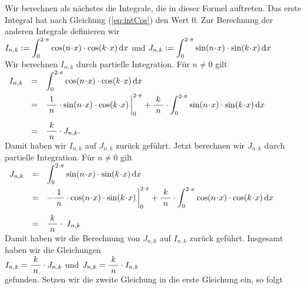 Wir berechnen als n\"achstes die Integrale, die in dieser Formel auftreten.
Das erste Integral hat nach Gleichung (\ref{eq:intCos}) den Wert 0.
Zur Berechnung der anderen Integrale definieren wir
\\[0.3cm]
\hspace*{1.3cm}
$I_{n,k} := \displaystyle\int_0^{2\cdot\pi} \cos(n\!\cdot\!x)\cdot\cos(k\!\cdot\!x)\, \textrm{d} x$
\quad und \quad
$J_{n,k} := \displaystyle\int_0^{2\cdot\pi} \sin(n\!\cdot\!x)\cdot\sin(k\!\cdot\!x)\, \textrm{d} x$
\\[0.3cm]
Wir berechnen $I_{n,k}$ durch partielle Integration. F\"ur $n\not=0$  gilt
\\[0.3cm]
\hspace*{1.3cm}
$
\begin{array}[t]{lcl}
I_{n,k} & = & \displaystyle\int_0^{2\cdot\pi} \cos(n\!\cdot\!x)\cdot\cos(k\!\cdot\!x)\, \dr x \\[0.3cm]
& = & \displaystyle 
      \bruch{1}{n}\cdot\sin(n\!\cdot\!x)\cdot\cos(k\!\cdot\!x)\, \bigg|_0^{2\cdot\pi} + 
       \bruch{k}{n} \cdot \int_0^{2\cdot\pi} \sin(n\!\cdot\!x)\cdot\sin(k\!\cdot\!x)\, \dr x \\[0.5cm]
& = & \displaystyle 
      \bruch{k}{n} \cdot J_{n,k}.
\end{array}
$
\\[0.3cm]
Damit haben wir $I_{n,k}$ auf $J_{n,k}$ zur\"uck gef\"uhrt.  Jetzt berechnen wir $J_{n,k}$
durch partielle Integration.  F\"ur $n\not=0$ gilt
\\[0.1cm]
\hspace*{1.3cm}
$
\begin{array}[t]{lcl}
  J_{n,k}  & = & \displaystyle\int_0^{2\cdot\pi} \sin(n\!\cdot\!x)\cdot\sin(k\!\cdot\!x)\, \dr x \\[0.3cm]
& = & \displaystyle 
   -\bruch{1}{n}\cdot\cos(n\!\cdot\!x)\cdot\sin(k\!\cdot\!x)\, \bigg|_0^{2\cdot\pi} + 
   \bruch{k}{n} \cdot \int_0^{2\cdot\pi} \cos(n\!\cdot\!x)\cdot\cos(k\!\cdot\!x)\, \dr x \\[0.5cm]
& = & \displaystyle
   \bruch{k}{n} \cdot\ I_{n,k}
\end{array}
$
\\[0.3cm]
Damit haben wir die Berechnung von $J_{n,k}$ auf $I_{n,k}$ zur\"uck gef\"uhrt.
Insgesamt haben wir die Gleichungen 
\\[0.3cm]
\hspace*{1.3cm}
$I_{n,k} = \displaystyle\frac{\;\displaystyle k\;}{\;\displaystyle n\;}\cdot J_{n,k}$ \quad und \quad $J_{n,k} = \displaystyle\frac{\;\displaystyle k\;}{\;\displaystyle n\;}\cdot I_{n,k}$
\\[0.3cm]
gefunden.  Setzen wir die zweite Gleichung in die erste Gleichung ein, so folgt
